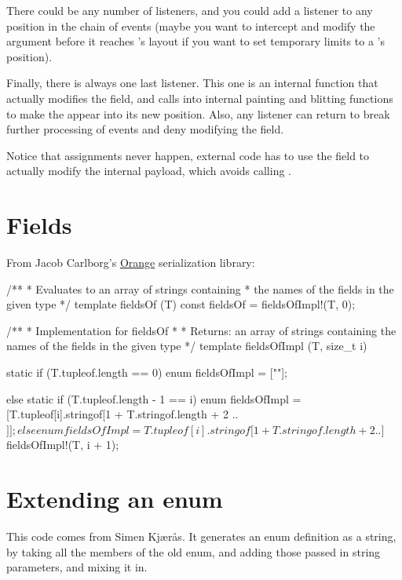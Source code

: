 There could be any number of listeners, and you could add a listener to any position in the chain of events (maybe you want to intercept and modify the argument before it reaches 's layout if you want to set temporary limits to a 's position).

Finally, there is always one last listener. This one is an internal function that actually modifies the  field, and calls into internal painting and blitting functions to make the  appear into its new position. Also, any listener can return  to break further processing of events and deny modifying the field.

Notice that assignments never happen, external code has to use the  field to actually modify the internal payload, which avoids calling .

\section{Fields}

From Jacob Carlborg's \href{https://github.com/jacob-carlborg/orange}{Orange} serialization library:

\begin{dcode}
/**
 * Evaluates to an array of strings containing 
 * the names of the fields in the given type
 */
template fieldsOf (T)
{
	const fieldsOf = fieldsOfImpl!(T, 0);
}

/**
 * Implementation for fieldsOf
 * 
 * Returns: an array of strings containing the names of the fields in the given type
 */
template fieldsOfImpl (T, size_t i)
{
    static if (T.tupleof.length == 0)
        enum fieldsOfImpl = [""];

    else static if (T.tupleof.length - 1 == i)
        enum fieldsOfImpl = [T.tupleof[i].stringof[1 + T.stringof.length + 2 .. $]];

    else
        enum fieldsOfImpl = T.tupleof[i].stringof[1 + T.stringof.length + 2 .. $] ~ fieldsOfImpl!(T, i + 1);
}
\end{dcode}

\section{Extending an enum}

This code comes from Simen Kj\ae r\r{a}s.  It generates an enum definition as a string, by taking all the members of the old enum, and adding those passed in string parameters, and mixing it in.

